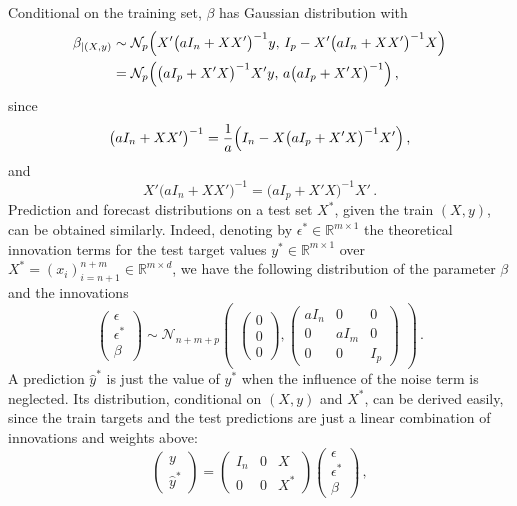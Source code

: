 \documentclass[a4paper,14pt]{article}
\newcommand{\Ncal}{\mathcal{N}}
\newcommand{\Real}{\mathbb{R}}
\begin{document}
Conditional on the training set, $\beta$ has Gaussian distribution with
\begin{align*}
  \beta_{|(X, y)}
  &\sim \Ncal_p\Bigl(
      X' \bigl(a I_n + XX'\bigr)^{-1} y, \,
      I_p - X'\bigl(a I_n + XX'\bigr)^{-1}X
    \Bigr) \\
  &= \Ncal_p\Bigl(
      \bigl(a I_p + X'X\bigr)^{-1} X' y, \,
      a \bigl(a I_p + X'X\bigr)^{-1}
    \Bigr) \,,
\end{align*}
since
$$ \bigl(a I_n + XX'\bigr)^{-1}
  = \frac{1}{a} \Bigl(I_n - X\bigl(aI_p + X'X\bigr)^{-1}X'\Bigr)
  \,, $$
and
$$ X' \bigl(a I_n + XX'\bigr)^{-1} = \bigl(a I_p + X'X\bigr)^{-1} X' \,. $$
Prediction and forecast distributions on a test set $X^*$, given the train $(X,y)$,
can be obtained similarly. Indeed, denoting by $\epsilon^*\in \Real^{m\times 1}$
the theoretical innovation terms for the test target values $y^*\in \Real^{m\times 1}$
over $X^* = (x_i)_{i=n+1}^{n+m}\in \Real^{m\times d}$, we have the following
distribution of the parameter $\beta$ and the innovations
$$ \begin{pmatrix} \epsilon \\ \epsilon^* \\ \beta \end{pmatrix}
  \sim \Ncal_{n+m+p}\begin{pmatrix} 
      \begin{pmatrix} 0 \\ 0 \\ 0 \end{pmatrix},
      \begin{pmatrix} a I_n & 0 & 0 \\ 0 & a I_m & 0 \\ 0 & 0 & I_p \end{pmatrix}
    \end{pmatrix}
  \,. $$
A prediction $\hat{y}^*$ is just the value of $y^*$ when the influence of the noise
term is neglected. Its distribution, conditional on $(X, y)$ and $X^*$, can be derived
easily, since the train targets and the test predictions are just a linear combination of
innovations and weights above:
$$ \begin{pmatrix} y \\ \hat{y}^* \end{pmatrix}
    = \begin{pmatrix}
      I_n & 0 & X \\
      0 & 0 & X^*
    \end{pmatrix}
    \begin{pmatrix} \epsilon \\ \epsilon^* \\ \beta \end{pmatrix}
  \,, $$
\end{document}
